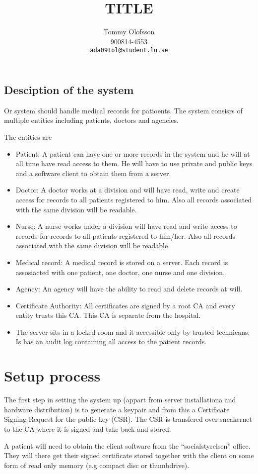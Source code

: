 \documentclass[10pt, a4paper]{article}
\title{TITLE}
\date{}
\author{Tommy Olofsson\\
  900814-4553\\
  \texttt{ada09tol@student.lu.se}}
\begin{document}
\begin{titlepage}
\maketitle
\begin{center}
\end{center}

\thispagestyle{empty}
\end{titlepage}
\setcounter{page}{2}
\subsection{Desciption of the system}
Or system should handle medical records for patioents. The system consisrs of multiple entities including patients, doctors and agencies. 

The entities are
\begin{itemize}
\item Patient: A patient can have one or more records in the system and he will at all time have read access to them. He will have to use private and public keys and a software client to obtain them from a server. 
\item Doctor: A doctor works at a division and will have read, write and create access for records to all patients registered to him. Also all records associated with the same division will be readable.
\item Nurse: A nurse works under a division will have read and write access to records for records to all patients registered to him/her. Also all records associated with the same division will be readable.
\item Medical record: A medical record is stored on a server. Each record is assosiacted with one patient, one doctor, one nurse and one division. 
\item Agency: An agency will have the ability to read and delete records at will.
\item Certificate Authority: All certificates are signed by a root CA and every entity trusts this CA. This CA is separate from the hospital.
\item The server sits in a locked room and it accessible only by trusted technicans. Is has an audit log containing all access to the patient records.
\end{itemize}

\section{Setup process}
The first step in setting the system up (appart from server installationa and hardware distribution) is to generate a keypair and from this a Certificate Signing Request for the public key (CSR). The CSR is transfered over sneakernet to the CA where it is signed and take back and stored. 

A patient will need to obtain the client software from the ``socialstyrelsen'' office. They will there get their signed certificate stored together with the client on some form of read only memory (e.g compact disc or thumbdrive).



\end{document}
